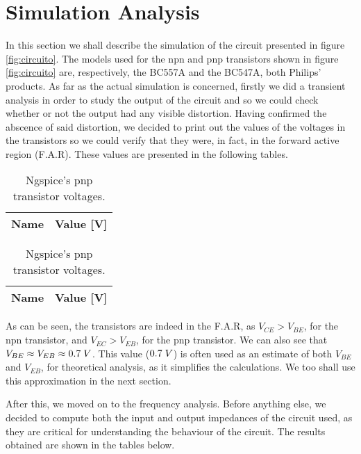 \clearpage

\section{Simulation Analysis}
\label{sec:simulation}

In this section we shall describe the simulation of the circuit presented in figure \ref{fig:circuito}.
The models used for the npn and pnp transistors shown in figure \ref{fig:circuito} are, respectively, the BC557A and the BC547A,
both Philips' products.
As far as the actual simulation is concerned, firstly we did a transient analysis in order to study the output of the circuit and
so we could check whether or not the output had any visible distortion. Having confirmed the abscence of said distortion, we decided to print out the values
of the voltages in the transistors so we could verify that they were, in fact, in the forward active region (F.A.R). These values
are presented in the following tables.

\begin{table}[h]
  \parbox{.45\linewidth}{
    \centering
    \begin{tabular}{|c|c|}
      \hline
      {\bf Name} & {\bf Value [V]} \\ \hline
      
    \end{tabular}
    \caption{Ngspice's npn transistor voltages.}
  }
  \hfill
  \parbox{.45\linewidth}{
    \centering
    \begin{tabular}{|c|c|}
      \hline
      {\bf Name} & {\bf Value [V]} \\ \hline
      
    \end{tabular}
    \caption{Ngspice's pnp transistor voltages.}
  }
\end{table}

As can be seen, the transistors are indeed in the F.A.R, as $V_{CE} > V_{BE}$, for the npn transistor, and $V_{EC} > V_{EB}$, for the pnp transistor.
We can also see that $V_{BE}\approx V_{EB}\approx 0.7\hspace{1mm}V$. This value ($0.7\hspace{1mm}V$) is often used as an estimate of both $V_{BE}$ and $V_{EB}$,
for theoretical analysis, as it simplifies the calculations. We too shall use this approximation in the next section.

After this, we moved on to the frequency analysis. Before anything else, we decided to compute both the input and output impedances of the circuit used,
as they are critical for understanding the behaviour of the circuit. The results obtained are shown in the tables below.

